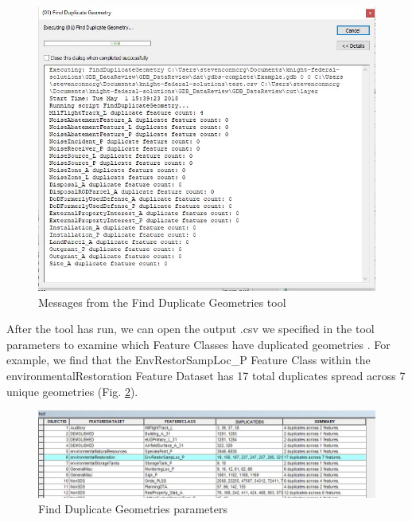 \documentclass[openany]{book}
\theoremstyle{definition}
\theoremstyle{definition}
\theoremstyle{definition}
\theoremstyle{remark}
\begin{document}
\begin{figure}[H]

{\centering \includegraphics{figures/dupG-messages} 

}

\caption{Messages from the Find Duplicate Geometries tool}\label{fig:dupGmessages}
\end{figure}

After the tool has run, we can open the output .csv we specified in the
tool parameters to examine which Feature Classes have duplicated
geometries . For example, we find that the EnvRestorSampLoc\_P Feature
Class within the environmentalRestoration Feature Dataset has 17 total
duplicates spread across 7 unique geometries (Fig. \ref{fig:dupGcsv}).

\begin{figure}[H]

{\centering \includegraphics{figures/dupG-csv} 

}

\caption{Find Duplicate Geometries parameters}\label{fig:dupGcsv}
\end{figure}
\end{document}
